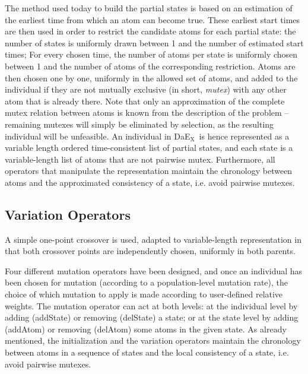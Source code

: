 \documentclass[a4paper,10pt]{article}
\def\DAEX{{\sc DaE$_{\text{X}}$}}
\begin{document}
The method used today to build the partial states is based on an estimation of the earliest time from which an atom can become true. %
These earliest start times are then used in order to restrict the candidate atoms for each partial state:
the number of states is uniformly drawn between 1 and the number of estimated start times; For every chosen time, the number of atoms per state is uniformly chosen between 1 and the number of atoms of the corresponding restriction.
Atoms are then chosen one by one, uniformly in the allowed set of atoms, and added to the individual if they are not mutually exclusive (in short, {\em mutex}) with any other atom that is already there. Note that only an approximation of the complete mutex relation between atoms is known from the description of the problem -- remaining mutexes will simply be eliminated by selection, as the resulting individual will be unfeasible. 
An individual in \DAEX\ is hence represented as a variable length ordered time-consistent list of partial states, and each state is a variable-length list of atoms that are not pairwise mutex. Furthermore, all operators that manipulate the representation maintain the chronology between atoms and the approximated consistency of a state, i.e. avoid pairwise mutexes.

\subsection{Variation Operators }

A simple one-point crossover is used, adapted to variable-length representation in that both crossover points are independently chosen, uniformly in both parents.

Four different mutation operators have been designed, and once an individual has been chosen for mutation (according to a population-level mutation rate),
the choice of which mutation to apply is made according to user-defined relative weights.
The mutation operator can act at both levels: at the individual level by adding (addState) or removing (delState) a state; or at the state level by adding (addAtom) or removing (delAtom) some atoms in the given
state. As already mentioned, the initialization and the variation operators maintain the chronology between atoms in a sequence of states and the local consistency 
of a state, i.e. avoid pairwise mutexes.
\end{document}
